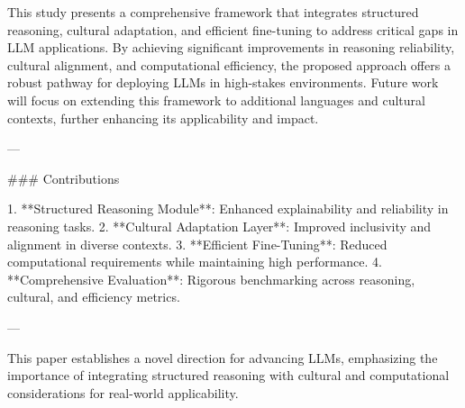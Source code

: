 This study presents a comprehensive framework that integrates structured reasoning, cultural adaptation, and efficient fine-tuning to address critical gaps in LLM applications. By achieving significant improvements in reasoning reliability, cultural alignment, and computational efficiency, the proposed approach offers a robust pathway for deploying LLMs in high-stakes environments. Future work will focus on extending this framework to additional languages and cultural contexts, further enhancing its applicability and impact.

---

### Contributions

1. **Structured Reasoning Module**: Enhanced explainability and reliability in reasoning tasks.
2. **Cultural Adaptation Layer**: Improved inclusivity and alignment in diverse contexts.
3. **Efficient Fine-Tuning**: Reduced computational requirements while maintaining high performance.
4. **Comprehensive Evaluation**: Rigorous benchmarking across reasoning, cultural, and efficiency metrics.

--- 

This paper establishes a novel direction for advancing LLMs, emphasizing the importance of integrating structured reasoning with cultural and computational considerations for real-world applicability.